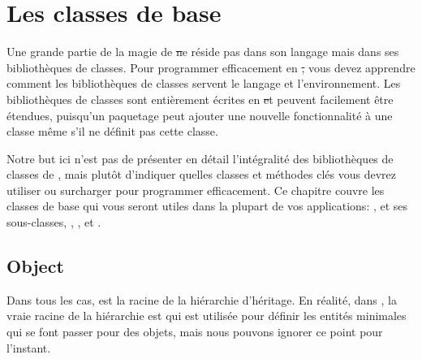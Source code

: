 \documentclass[a4paper,10pt,twoside]{book}
\begin{document}
	\renewcommand{\nnbb}[2]{} %
	\sloppy
\fi
\chapter{Les classes de base}
Une grande partie de la magie de \st ne réside pas dans son langage mais dans ses bibliothèques de classes. Pour programmer efficacement en \st, vous devez apprendre comment les bibliothèques de classes servent le langage et l'environnement. Les bibliothèques de classes sont entièrement écrites en \st et peuvent facilement être étendues, puisqu'un paquetage peut ajouter une nouvelle fonctionnalité à une classe même s'il ne définit pas cette classe. 

Notre but ici n'est pas de présenter en détail l'intégralité
des bibliothèques de classes de \pharo, mais plutôt d'indiquer
quelles classes et méthodes clés vous devrez utiliser ou surcharger 
pour programmer efficacement. Ce chapitre couvre les classes de base 
qui vous seront utiles dans la plupart de vos applications: ,  
et ses sous-classes, , ,  et .


\section{Object}

Dans tous les cas,  est la racine de la hiérarchie d'héritage. En réalité, dans \pharo , la vraie racine de la hiérarchie est  qui est utilisée pour définir les entités minimales qui se font passer pour des objets, mais nous pouvons ignorer ce point pour l'instant.
\end{document}
